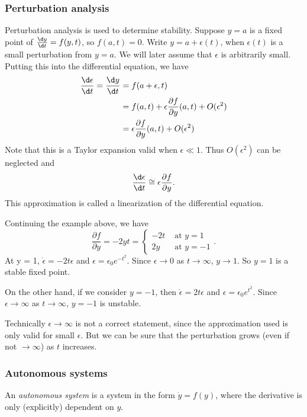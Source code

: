 \documentclass[a4paper]{article}
\begin{document}
\subsubsection{Perturbation analysis}
Perturbation analysis is used to determine stability. Suppose $y = a$ is a fixed point of $\frac{\d y}{\d t} = f(y, t)$, so $f(a, t) = 0$. Write $y = a + \epsilon(t)$, when $\epsilon(t)$ is a small perturbation from $y = a$. We will later assume that $\epsilon$ is arbitrarily small. Putting this into the differential equation, we have
\begin{align*}
  \frac{\d \epsilon}{\d t} = \frac{\d y}{\d t} &= f(a + \epsilon, t)\\
  &= f(a, t) + \epsilon\frac{\partial f}{\partial y}(a, t) + O(\epsilon^2)\\
  &= \epsilon\frac{\partial f}{\partial y}(a, t) + O(\epsilon^2)
\end{align*}
Note that this is a Taylor expansion valid when $\epsilon \ll 1$. Thus $O(\epsilon^2)$ can be neglected and
\[
\frac{\d \epsilon}{\d t} \cong \epsilon\frac{\partial f}{\partial y}.
\]
This approximation is called a linearization of the differential equation.
\begin{eg}
  Continuing the example above, we have
  \[
  \frac{\partial f}{\partial y} = -2yt =
  \begin{cases}
    -2t & \text{ at } y = 1\\
    2y & \text{ at } y = -1
  \end{cases}.
  \]
  At y = 1, $\dot{\epsilon} = -2t\epsilon$ and $\epsilon = \epsilon_0 e^{-t^2}$. Since $\epsilon \to 0$ as $t \to \infty$, $y \to 1$. So $y = 1$ is a stable fixed point.

  On the other hand, if we consider $y = -1$, then $\dot\epsilon = 2t\epsilon$ and $\epsilon = \epsilon_0 e^{t^2}$. Since $\epsilon \to \infty$ as $t\to \infty$, $y = -1$ is unstable.

\note Technically $\epsilon \to \infty$ is not a correct statement, since the approximation used is only valid for small $\epsilon$. But we can be sure that the perturbation grows (even if not $\to \infty$) as $t$ increases.
\end{eg}

\subsubsection{Autonomous systems}
\begin{defi}
  An \emph{autonomous system} is a system in the form $\dot y = f(y)$, where the derivative is only (explicitly) dependent on $y$.
\end{defi}
\end{document}
